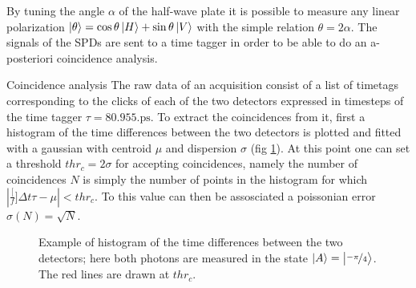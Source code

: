 \documentclass[a4paper, 11pt]{article}
\begin{document}
  By tuning the angle $\alpha$ of the half-wave plate it is possible to measure any linear polarization $\ket{\theta} = \cos{\theta}\ket{H} + \sin{\theta}\ket{V}$ with the simple relation $\theta = 2\alpha$.
  The signals of the SPDs are sent to a time tagger in order to be able to do an a-posteriori coincidence analysis.

  \par{Coincidence analysis}
  The raw data of an acquisition consist of a list of timetags corresponding to the clicks of each of the two detectors expressed in timesteps of the time tagger $\tau = 80.955\si{.\pico\second}$. To extract the coincidences from it, first a histogram of the time differences between the two detectors is plotted and fitted with a gaussian with centroid $\mu$ and dispersion $\sigma$ (fig \ref{fig:hist}). At this point one can set a threshold $thr_{c} = 2\sigma$ for accepting coincidences, namely the number of coincidences $N$ is simply the number of points in the histogram for which $|\frac[f]{\Delta t}{\tau} - \mu| < thr_{c}$. To this value can then be assosciated a poissonian error $\sigma(N) = \sqrt{N}$.

  \begin{figure}[H]
    \centering
    \caption{Example of histogram of the time differences between the two detectors; here both photons are measured in the state $\ket{A} = \ket{\frac[f]{-\pi}{4}}$. The red lines are drawn at $thr_c$.}
    \label{fig:hist}
  \end{figure}
\end{document}
